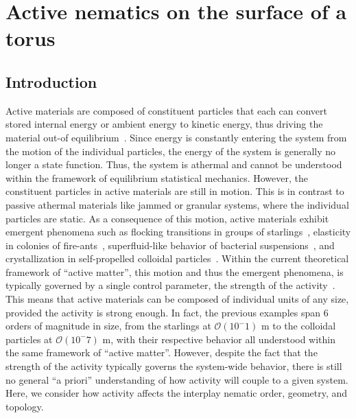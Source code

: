 \chapter{Active nematics on the surface of a torus}\label{c:3}
\section{Introduction}
Active materials are composed of constituent particles that each can convert stored internal energy or ambient energy to kinetic energy, thus driving the material out-of equilibrium~\cite{RN237,RN238,RN40}.
Since energy is constantly entering the system from the motion of the individual particles, the energy of the system is generally no longer a state function.
Thus, the system is athermal and cannot be understood within the framework of equilibrium statistical mechanics.
However, the constituent particles in active materials are still in motion.
This is in contrast to passive athermal materials like jammed or granular systems, where the individual particles are static.
As a consequence of this motion, active materials exhibit emergent phenomena such as flocking transitions in groups of starlings~\cite{RN239,RN240}, elasticity in colonies of fire-ants~\cite{RN242}, superfluid-like behavior of bacterial suspensions~\cite{RN270,RN271}, and crystallization in self-propelled colloidal particles~\cite{RN168,RN38}.
Within the current theoretical framework of ``active matter'', this motion and thus the emergent phenomena, is typically governed by a single control parameter, the strength of the activity~\cite{RN237,RN238,RN40}.
This means that active materials can be composed of individual units of any size, provided the activity is strong enough.
In fact, the previous examples span 6 orders of magnitude in size, from the starlings at $\mathcal{O}(10^-1)$ m to the colloidal particles at $\mathcal{O}(10^-7)$ m, with their respective behavior all understood within the same framework of ``active matter''.
However, despite the fact that the strength of the activity typically governs the system-wide behavior, there is still no general ``a priori'' understanding of how activity will couple to a given system.
Here, we consider how activity affects the interplay nematic order, geometry, and topology.

